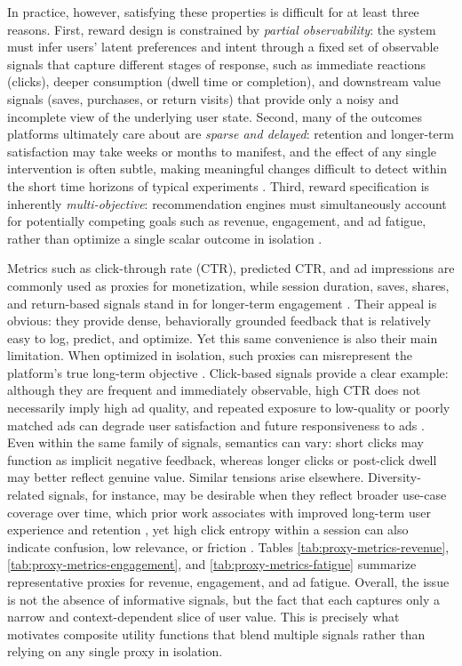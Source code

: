 \documentclass[manuscript,review,screen]{acmart}
\begin{document}
In practice, however, satisfying these properties is difficult for at least three reasons. First, reward design is constrained by \textit{partial observability}: the system must infer users’ latent preferences and intent through a fixed set of observable signals that capture different stages of response, such as immediate reactions (clicks), deeper consumption (dwell time or completion), and downstream value signals (saves, purchases, or return visits) that provide only a noisy and incomplete view of the underlying user state. Second, many of the outcomes platforms ultimately care about are \textit{sparse and delayed}: retention and longer-term satisfaction may take weeks or months to manifest, and the effect of any single intervention is often subtle, making meaningful changes difficult to detect within the short time horizons of typical experiments \cite{mcdonald2023impatient}. Third, reward specification is inherently \textit{multi-objective}: recommendation engines must simultaneously account for potentially competing goals such as revenue, engagement, and ad fatigue, rather than optimize a single scalar outcome in isolation \cite{zhang2018whole, yan2020ads, sagtani2024ad}.

Metrics such as click-through rate (CTR), predicted CTR, and ad impressions are commonly used as proxies for monetization, while session duration, saves, shares, and return-based signals stand in for longer-term engagement \cite{wang2022surrogate}. Their appeal is obvious: they provide dense, behaviorally grounded feedback that is relatively easy to log, predict, and optimize. Yet this same convenience is also their main limitation. When optimized in isolation, such proxies can misrepresent the platform’s true long-term objective \cite{mazoure2021improving}. Click-based signals provide a clear example: although they are frequent and immediately observable, high CTR does not necessarily imply high ad quality, and repeated exposure to low-quality or poorly matched ads can degrade user satisfaction and future responsiveness to ads \cite{hohnhold2015focusing, silberstein2020ad, yan2020ads}. Even within the same family of signals, semantics can vary: short clicks may function as implicit negative feedback, whereas longer clicks or post-click dwell may better reflect genuine value. Similar tensions arise elsewhere. Diversity-related signals, for instance, may be desirable when they reflect broader use-case coverage over time, which prior work associates with improved long-term user experience and retention \cite{wang2022surrogate, xu2023optimizing}, yet high click entropy within a session can also indicate confusion, low relevance, or friction \cite{sagtani2023quantifying}. Tables \ref{tab:proxy-metrics-revenue}, \ref{tab:proxy-metrics-engagement}, and \ref{tab:proxy-metrics-fatigue} summarize representative proxies for revenue, engagement, and ad fatigue. Overall, the issue is not the absence of informative signals, but the fact that each captures only a narrow and context-dependent slice of user value. This is precisely what motivates composite utility functions that blend multiple signals rather than relying on any single proxy in isolation.
\end{document}

